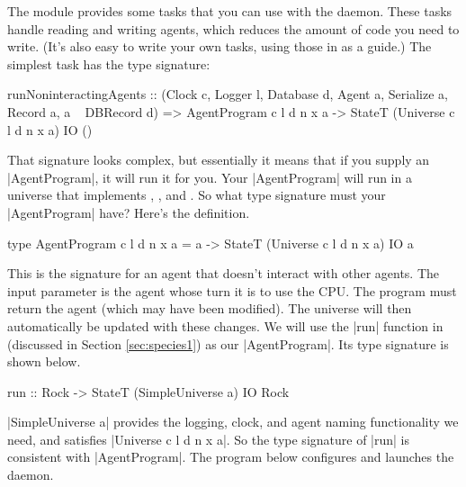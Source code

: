 
The module  provides some tasks
that you can use with the daemon.
These tasks handle reading and writing agents,
which reduces the amount of code you need to write.
(It's also easy to write your own tasks, using those in 
 as a guide.)
The simplest task has the type signature:

\begin{code}
runNoninteractingAgents :: (Clock c, Logger l, Database d, Agent a, 
    Serialize a, Record a, a ~ DBRecord d) =>
  AgentProgram c l d n x a -> StateT (Universe c l d n x a) IO ()
\end{code}

That signature looks complex, but essentially it means that if you
supply an |AgentProgram|, it will run it for you.
Your |AgentProgram| will run in a universe that implements
,
, and
.
So what type signature must your |AgentProgram| have?
Here's the definition.

\begin{code}
type AgentProgram c l d n x a = a -> StateT (Universe c l d n x a) IO a
\end{code}

This is the signature for an agent that doesn't interact with other
agents.
The input parameter is the agent whose turn it is to use the CPU.
The program must return the agent (which may have been modified).
The universe will then automatically be updated with these changes.
We will use the |run| function in 
(discussed in Section \ref{sec:species1}) as our |AgentProgram|.
Its type signature is shown below.

\begin{code}
run :: Rock -> StateT (SimpleUniverse a) IO Rock
\end{code}

|SimpleUniverse a| provides the logging, clock, and agent naming
functionality we need, and satisfies |Universe c l d n x a|.
So the type signature of |run| is consistent with |AgentProgram|.
The program below configures and launches the daemon.


